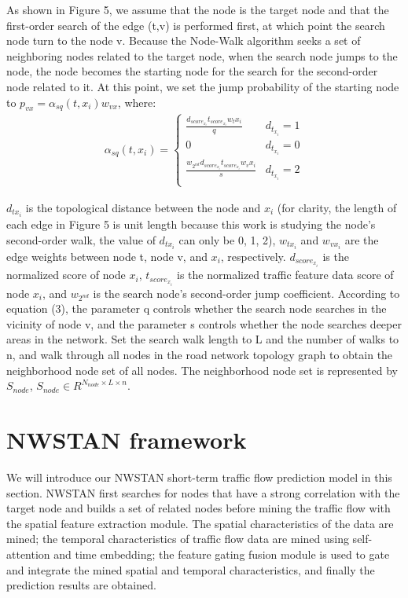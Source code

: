 \documentclass[conference]{IEEEtran}
\begin{document}
\par
As shown in Figure 5, we assume that the node is the target node and that the first-order search of the edge (t,v) is performed first, at which point the search node turn to the node v. Because the Node-Walk algorithm seeks a set of neighboring nodes related to the target node, when the search node jumps to the node, the node becomes the starting node for the search for the second-order node related to it. At this point, we set the jump probability of the starting node to $p_{vx} = \alpha _{sq}(t,x_i)w_{vx}$, where:
\begin{eqnarray}
    \alpha _{sq}(t,x_i) =
    \begin{cases}
    \frac{d_{score_{x_i}}t_{score_{x_i}}w_t{x_i}}{q} & d_{t_{x_i}} = 1 \\
    0  &  d_{t_{x_i}} = 0 \\
    \frac{w_{2^{nd}}d_{score_{x_i}}t_{score_{x_i}}w_v{x_i}}{s}  & d_{t_{x_i}} = 2 \\
    \end{cases}
\end{eqnarray}  

\par
$d_{tx_i}$ is the topological distance between the node and $x_i$ (for clarity, the length of each edge in Figure 5 is unit length because this work is studying the node's second-order walk, the value of $d_{tx_i}$ can only be 0, 1, 2), $w_{tx_i}$ and $w_{vx_i}$ are the edge weights between node t, node v, and $x_i$, respectively. $d_{score_{x_i}}$ is the normalized score of node $x_i$, $t_{score_{x_i}}$ is the normalized traffic feature data score of node $x_i$, and $w_{2^{nd}}$ is the search node's second-order jump coefficient. According to equation (3), the parameter q controls whether the search node searches in the vicinity of node v, and the parameter s controls whether the node searches deeper areas in the network.
Set the search walk length to L and the number of walks to n, and walk through all nodes in the road network topology graph to obtain the neighborhood node set of all nodes. The neighborhood node set is represented by $S_{node}$, $S_{node}\in R^{N_{node}\times L\times n}$.

\section{NWSTAN framework}
We will introduce our NWSTAN short-term traffic flow prediction model in this section. NWSTAN first searches for nodes that have a strong correlation with the target node and builds a set of related nodes before mining the traffic flow with the spatial feature extraction module. The spatial characteristics of the data are mined; the temporal characteristics of traffic flow data are mined using self-attention and time embedding; the feature gating fusion module is used to gate and integrate the mined spatial and temporal characteristics, and finally the prediction results are obtained.
\end{document}
